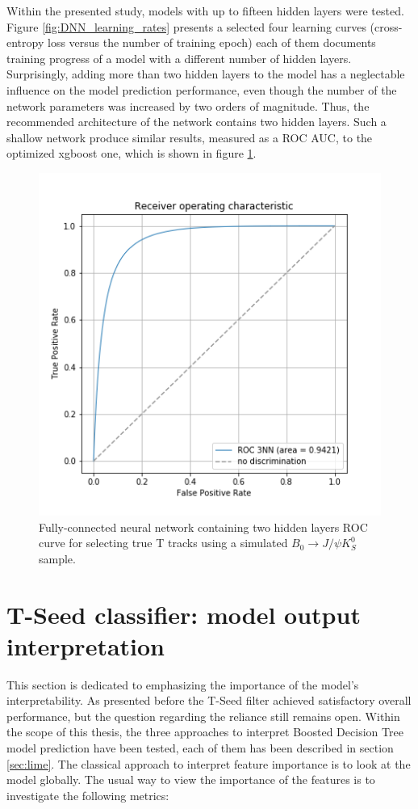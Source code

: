 Within the presented study, models with up to fifteen hidden layers were tested. Figure \ref{fig:DNN_learning_rates} presents a selected four learning curves (cross-entropy loss versus the number of training epoch) each of them documents training progress of a model with a different number of hidden layers. Surprisingly, adding more than two hidden layers to the model has a neglectable influence on the model prediction performance, even though the number of the network parameters was increased by two orders of magnitude.  Thus, the recommended architecture of the network contains two hidden layers. Such a shallow network 
produce similar results, measured as a ROC AUC, to the optimized xgboost one, which is shown in figure \ref{fig:DNN_roc}.

\begin{figure}[!ht]
\centering
\includegraphics[scale=0.7]{figures/NN/roc_3nn.png}
\caption{ Fully-connected neural network containing two hidden layers ROC curve for selecting true T tracks using a simulated  $B_0\rightarrow J/\psi K_S^0 $ sample.      
\label{fig:DNN_roc}}
\end{figure}


\section{T-Seed classifier: model output interpretation}

This section is dedicated to emphasizing the importance of the model's interpretability. As presented before the T-Seed filter achieved satisfactory overall performance, but the question regarding the reliance still remains open.
Within the scope of this thesis, the three approaches to interpret Boosted Decision Tree model prediction have been tested, each of them has been described in section \ref{sec:lime}. 
The classical approach to interpret feature importance is to look at the model globally. The usual way to view the importance of the features is to investigate the following metrics: 

